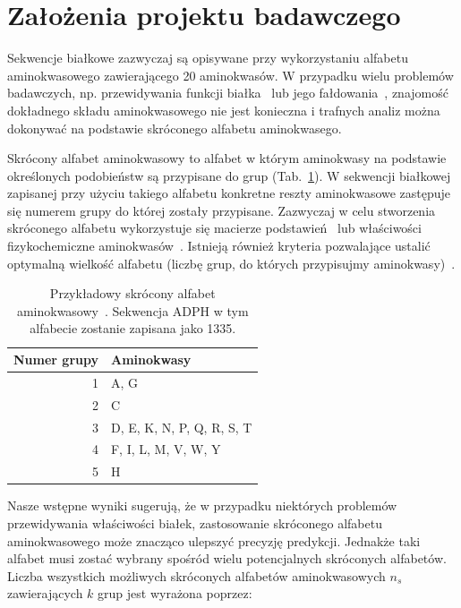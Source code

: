 \documentclass{article}
\author{Michał Burdukiewicz, Przemysław Gagat}
\title{Tworzenie skróconych alfabetów aminokwasowych dla białek 
amyloidogennych\linebreak \vskip{} 
\large{Projekt badawczy Doktoranckiego Koła Naukowego Bioinformatyki}}
\date{}
\begin{document}
\maketitle

\section{Założenia projektu badawczego}

Sekwencje białkowe zazwyczaj są opisywane przy wykorzystaniu alfabetu 
aminokwasowego zawierającego 20 aminokwasów. W przypadku wielu problemów 
badawczych, np. przewidywania funkcji białka~\citep{longo_simplified_2013} lub 
jego fałdowania~\citep{murphy_simplified_2000}, znajomość dokładnego składu 
aminokwasowego nie jest konieczna i trafnych analiz można dokonywać na podstawie 
skróconego alfabetu aminokwasego.

Skrócony alfabet aminokwasowy to alfabet w którym aminokwasy na podstawie 
określonych podobieństw są przypisane do grup (Tab.~\ref{tab:przykladowy}). 
W sekwencji białkowej zapisanej przy użyciu takiego alfabetu konkretne reszty 
aminokwasowe zastępuje się numerem grupy do której zostały przypisane.
Zazwyczaj w celu stworzenia skróconego alfabetu wykorzystuje się macierze 
podstawień~\citep{cannata_simplifying_2002} lub właściwości fizykochemiczne 
aminokwasów~\citep{stephenson_unearthing_2013}. Istnieją również
kryteria pozwalające ustalić optymalną wielkość alfabetu (liczbę grup, do 
których przypisujmy aminokwasy)~\citep{solis_amino_2015}.

\begin{table}[ht]
\centering
\caption{Przykładowy skrócony alfabet 
aminokwasowy~\citep{melo_accuracy_2006}. Sekwencja ADPH w tym alfabecie 
zostanie zapisana jako 1335.} 
\begin{tabular}{rl}
  \toprule
Numer grupy & Aminokwasy \\ 
  \midrule
  1 & A, G \\ 
   \rowcolor[gray]{0.85}  2 & C \\ 
    3 & D, E, K, N, P, Q, R, S, T \\ 
   \rowcolor[gray]{0.85}  4 & F, I, L, M, V, W, Y \\ 
    5 & H \\ 
   \bottomrule
\end{tabular}
\label{tab:przykladowy}
\end{table}

Nasze wstępne wyniki sugerują, że w przypadku niektórych problemów 
przewidywania właściwości białek, zastosowanie skróconego alfabetu 
aminokwasowego może znacząco ulepszyć precyzję predykcji. Jednakże taki alfabet  
musi zostać wybrany spośród wielu potencjalnych skróconych alfabetów. Liczba 
wszystkich możliwych skróconych alfabetów aminokwasowych $n_s$ zawierających $k$ 
grup jest wyrażona poprzez: 
\end{document}
